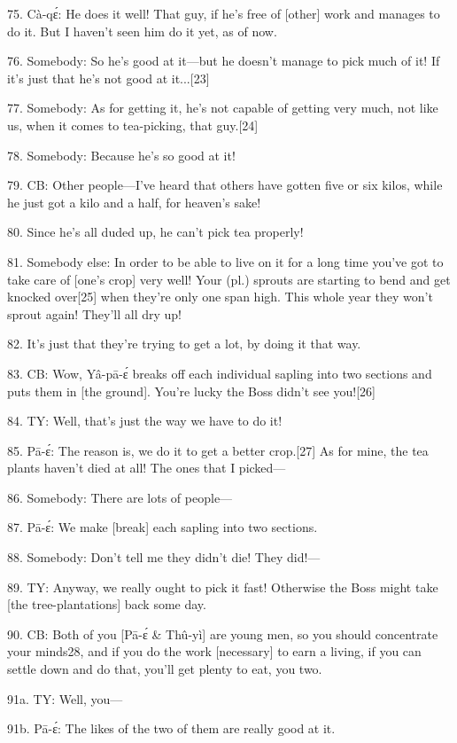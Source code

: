 75. Cà-qɛ́: He does it well!  That guy, if he's free of [other] work and manages
to do it.  But I haven't seen him do it yet, as of now.

76. Somebody: So he's good at it---but he doesn't manage to pick much of it!  If
it's just that he's not good at it...[23]

77. Somebody: As for getting it, he's not capable of getting very much, not like
us, when it comes to tea-picking, that guy.[24]

78. Somebody: Because he's so good at it!

79. CB: Other people---I've heard that others have gotten five or six kilos, while
he just got a kilo and a half, for heaven's sake!

80. Since he's all duded up, he can't pick tea properly!

81. Somebody else: In order to be able to live on it for a long time you've got
to take care of [one's crop] very well!  Your (pl.) sprouts are starting to bend
and get knocked over[25] when they're only one span high.  This whole year they
won't sprout again!  They'll all dry up!

82. It's just that they're trying to get a lot, by doing it that way.

83. CB: Wow, Yâ-pā-ɛ́\textit{ }breaks off each individual sapling into two
sections and puts them in [the ground].  You're lucky the Boss didn't see you![26]

84. TY: Well, that's just the way we have to do it!

85. Pā-ɛ́: The reason is, we do it to get a better crop.[27]  As for mine,
the tea plants haven't died at all!  The ones that I picked---

86. Somebody: There are lots of people---

87. Pā-ɛ́: We make [break] each sapling into two sections.

88. Somebody: Don't tell me they didn't die!  They did!---

89. TY: Anyway, we really ought to pick it fast!  Otherwise the Boss might take
[the tree-plantations] back some day.

90. CB: Both of you [Pā-ɛ́ \& Thû-yì] are young men, so you should concentrate
your minds28, and if you do the work [necessary] to earn a living, if you can settle
down and do that, you'll get plenty to eat, you two.

91a. TY: Well, you---

91b. Pā-ɛ́: The likes of the two of them are really good at it.

